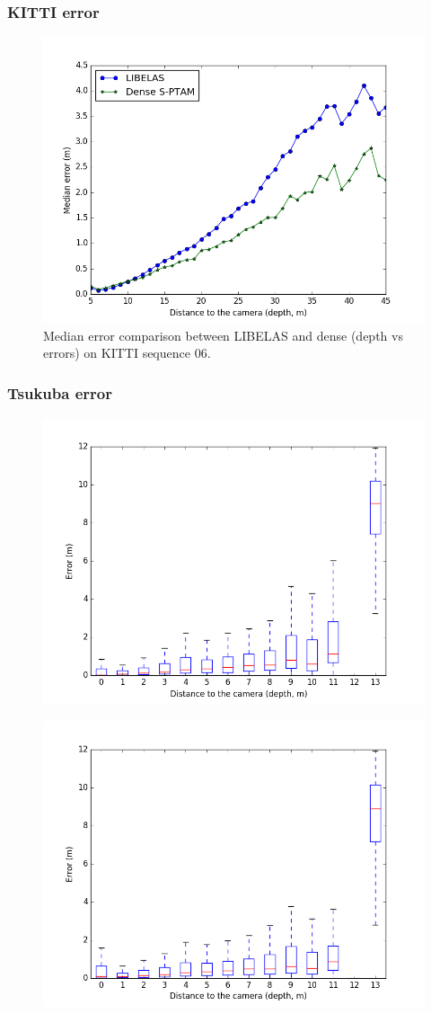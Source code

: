 \documentclass[compress]{beamer}
\begin{document}
\begin{frame}
	\frametitle{KITTI error}
	\begin{figure}[!htb]
		\centering
		\includegraphics[width=0.33\columnwidth]{images/medians_comparison_kitti}
		\caption{Median error comparison between LIBELAS and dense (depth vs errors) on KITTI sequence 06.}
		\label{fig:median_comparison_kitti}
	\end{figure}
\end{frame}

\begin{frame}
	\frametitle{Tsukuba error}
	\begin{figure}[!htb]
		\centering
		\includegraphics[width=0.33\columnwidth]{images/tsukuba_libelas_boxplot}
		\label{fig:tsukuba_libelas_boxplot}
	\end{figure}
	\begin{figure}[!htb]
		\centering
		\includegraphics[width=0.33\columnwidth]{images/tsukuba_dense_boxplot}
		\label{fig:tsukuba_dense_boxplot}
	\end{figure}
\end{frame}
\end{document}
